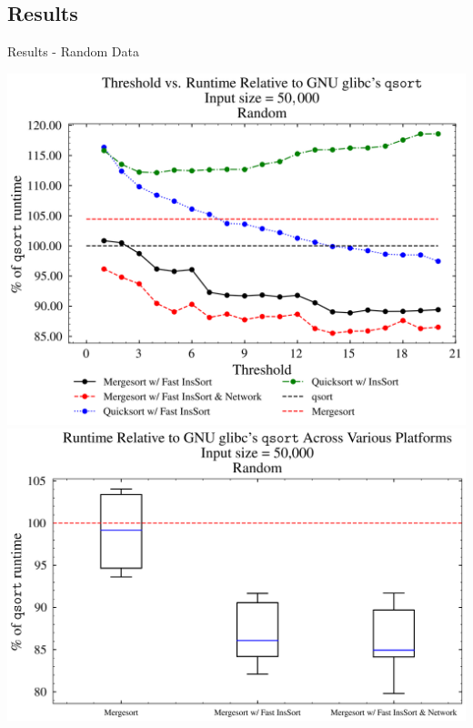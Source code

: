 \documentclass[13pt]{beamer}
\begin{document}
\subsection{Results}
\begin{frame}{Results - Random Data}
	\begin{multicols}{2}
		\includegraphics[width=\columnwidth]{../figures/random.png}
		\includegraphics[width=\columnwidth]{../figures/boxplots/4.gen.png}
	\end{multicols}
\end{frame}
\end{document}
